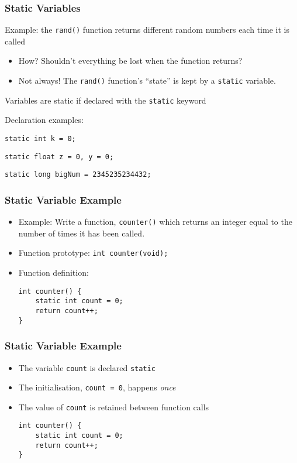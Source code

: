 \documentclass[14pt]{beamer}
\begin{document}
\begin{frame}
\frametitle{Static Variables}
\begin{itemize}
\item Example: the \texttt{rand()} function returns different random numbers each time it is called
	\begin{itemize}
		\item How? Shouldn't everything be lost when the function returns?
		\item Not always! The \texttt{rand()} function's ``state'' is kept by a \texttt{static} variable.
	\end{itemize}
\pause
\item Variables are static if declared with the \texttt{static} keyword
\item Declaration examples:
\pause
{\small
\item \texttt{static int k = 0;}
\item \texttt{static float z = 0, y = 0;}
\item \texttt{static long bigNum = 2345235234432;}
}
\end{itemize}
\end{frame}

\begin{frame}[fragile]
\frametitle{Static Variable Example}
\begin{itemize}
\item Example: Write a function, \texttt{counter()} which returns an integer equal to the number of times it has been called.
\pause
\item Function prototype: \texttt{int counter(void);}
\pause
\item Function definition:
\begin{lstlisting}[style=CStyle]
int counter() {
	static int count = 0;
	return count++;
}
\end{lstlisting}
\end{itemize}
\end{frame}

\begin{frame}[fragile]
\frametitle{Static Variable Example}
\begin{itemize}
\item The variable \texttt{count} is declared \texttt{static}
\item The initialisation, \texttt{count = 0}, happens \textit{once}
\item The value of \texttt{count} is retained between function calls 
\begin{lstlisting}[style=CStyle]
int counter() {
	static int count = 0;
	return count++;
}
\end{lstlisting}
\end{itemize}
\end{frame}
\end{document}
